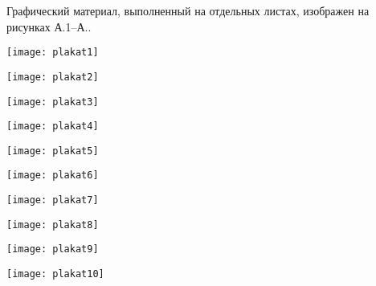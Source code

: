 
Графический материал, выполненный на отдельных листах,
изображен на рисунках А.1--А..
\setcounter{числоПлакатов}{0}

\renewcommand{\thefigure}{А.\arabic{figure}} %

\begin{landscape}

\begin{плакат}
	\texttt{[image: plakat1]}
	\label{plakat1:image}      
\end{плакат}

\begin{плакат}
	\texttt{[image: plakat2]}
	\label{plakat2:image}      
\end{плакат}

\begin{плакат}
	\texttt{[image: plakat3]}
	\label{plakat3:image}      
\end{плакат}

\begin{плакат}
	\texttt{[image: plakat4]}
	\label{plakat4:image}      
\end{плакат}

\begin{плакат}
	\texttt{[image: plakat5]}
	\label{plakat5:image}      
\end{плакат}

\begin{плакат}
	\texttt{[image: plakat6]}
	\label{plakat6:image}      
\end{плакат}

\begin{плакат}
	\texttt{[image: plakat7]}
	\label{plakat7:image}      
\end{плакат}

\begin{плакат}
	\texttt{[image: plakat8]}
	\label{plakat8:image}      
\end{плакат}

\begin{плакат}
	\texttt{[image: plakat9]}
	\label{plakat9:image}      
\end{плакат}

\begin{плакат}
	\texttt{[image: plakat10]}
	\label{plakat10:image}      
\end{плакат}

\end{landscape}
